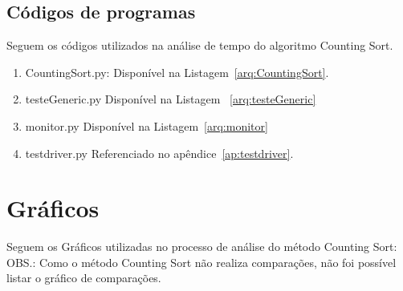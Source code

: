 \documentclass[12pt,a4paper,twoside]{report}
\begin{document}
\section{Códigos de programas}
Seguem os códigos utilizados na análise de tempo do algoritmo Counting Sort.
\begin{enumerate}

\item CountingSort.py:
Disponível na Listagem~\ref{arq:CountingSort}.


\item testeGeneric.py
Disponível na Listagem ~\ref{arq:testeGeneric}


\item monitor.py
Disponível na Listagem~\ref{arq:monitor}



\item testdriver.py
 Referenciado no apêndice~\ref{ap:testdriver}.
\end{enumerate}


\chapter{Gráficos}

Seguem os Gráficos utilizadas no processo de análise do método Counting Sort:
OBS.: Como o método Counting Sort não realiza comparações, não foi possível listar o gráfico de comparações.
\end{document}
